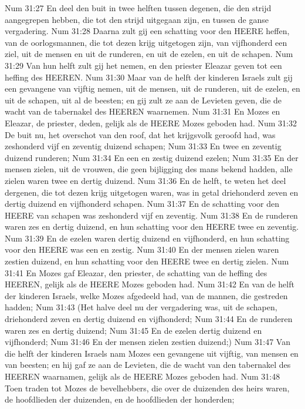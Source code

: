 Num 31:27  En deel den buit in twee helften tussen degenen, die den strijd aangegrepen hebben, die tot den strijd uitgegaan zijn, en tussen de ganse vergadering.
Num 31:28  Daarna zult gij een schatting voor den HEERE heffen, van de oorlogsmannen, die tot dezen krijg uitgetogen zijn, van vijfhonderd een ziel, uit de mensen en uit de runderen, en uit de ezelen, en uit de schapen.
Num 31:29  Van hun helft zult gij het nemen, en den priester Eleazar geven tot een heffing des HEEREN.
Num 31:30  Maar van de helft der kinderen Israels zult gij een gevangene van vijftig nemen, uit de mensen, uit de runderen, uit de ezelen, en uit de schapen, uit al de beesten; en gij zult ze aan de Levieten geven, die de wacht van de tabernakel des HEEREN waarnemen.
Num 31:31  En Mozes en Eleazar, de priester, deden, gelijk als de HEERE Mozes geboden had.
Num 31:32  De buit nu, het overschot van den roof, dat het krijgsvolk geroofd had, was zeshonderd vijf en zeventig duizend schapen;
Num 31:33  En twee en zeventig duizend runderen;
Num 31:34  En een en zestig duizend ezelen;
Num 31:35  En der mensen zielen, uit de vrouwen, die geen bijligging des mans bekend hadden, alle zielen waren twee en dertig duizend.
Num 31:36  En de helft, te weten het deel dergenen, die tot dezen krijg uitgetogen waren, was in getal driehonderd zeven en dertig duizend en vijfhonderd schapen.
Num 31:37  En de schatting voor den HEERE van schapen was zeshonderd vijf en zeventig.
Num 31:38  En de runderen waren zes en dertig duizend, en hun schatting voor den HEERE twee en zeventig.
Num 31:39  En de ezelen waren dertig duizend en vijfhonderd, en hun schatting voor den HEERE was een en zestig.
Num 31:40  En der mensen zielen waren zestien duizend, en hun schatting voor den HEERE twee en dertig zielen.
Num 31:41  En Mozes gaf Eleazar, den priester, de schatting van de heffing des HEEREN, gelijk als de HEERE Mozes geboden had.
Num 31:42  En van de helft der kinderen Israels, welke Mozes afgedeeld had, van de mannen, die gestreden hadden;
Num 31:43  (Het halve deel nu der vergadering was, uit de schapen, driehonderd zeven en dertig duizend en vijfhonderd;
Num 31:44  En de runderen waren zes en dertig duizend;
Num 31:45  En de ezelen dertig duizend en vijfhonderd;
Num 31:46  En der mensen zielen zestien duizend;)
Num 31:47  Van die helft der kinderen Israels nam Mozes een gevangene uit vijftig, van mensen en van beesten; en hij gaf ze aan de Levieten, die de wacht van den tabernakel des HEEREN waarnamen, gelijk als de HEERE Mozes geboden had.
Num 31:48  Toen traden tot Mozes de bevelhebbers, die over de duizenden des heirs waren, de hoofdlieden der duizenden, en de hoofdlieden der honderden;
